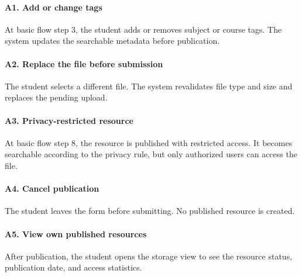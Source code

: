 \documentclass[12pt]{article}
\begin{document}
\paragraph*{A1. Add or change tags}
\par\medskip

At basic flow step 3, the student adds or removes subject or course tags. The system updates the searchable metadata before publication.
\par\medskip

\hypertarget{sec:a2-replace-the-file-before-submission}{}
\paragraph*{A2. Replace the file before submission}
\par\medskip

The student selects a different file. The system revalidates file type and size and replaces the pending upload.
\par\medskip

\hypertarget{sec:a3-privacy-restricted-resource}{}
\paragraph*{A3. Privacy-restricted resource}
\par\medskip

At basic flow step 8, the resource is published with restricted access. It becomes searchable according to the privacy rule, but only authorized users can access the file.
\par\medskip

\hypertarget{sec:a4-cancel-publication}{}
\paragraph*{A4. Cancel publication}
\par\medskip

The student leaves the form before submitting. No published resource is created.
\par\medskip

\hypertarget{sec:a5-view-own-published-resources}{}
\paragraph*{A5. View own published resources}
\par\medskip

After publication, the student opens the storage view to see the resource status, publication date, and access statistics.
\par\medskip
\end{document}
